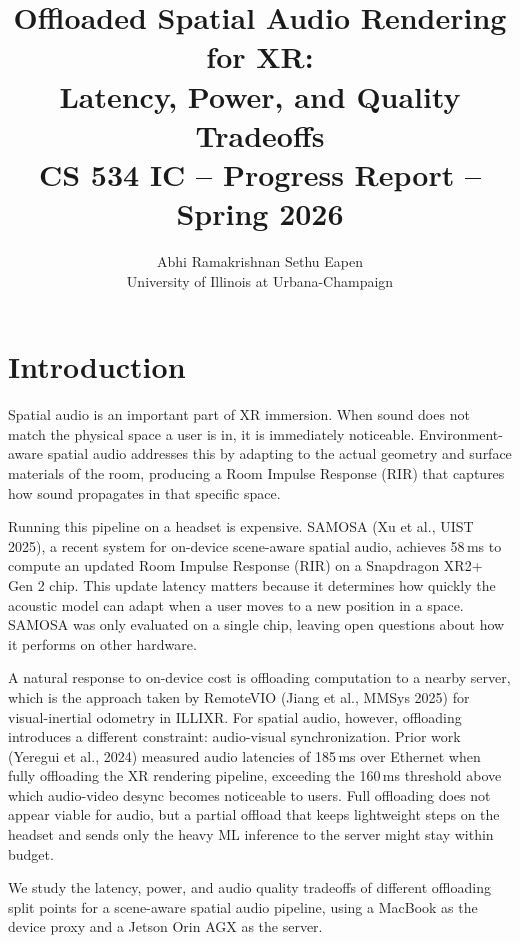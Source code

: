 \documentclass[11pt]{article}
\title{\textbf{Offloaded Spatial Audio Rendering for XR:\\
       Latency, Power, and Quality Tradeoffs}\\[6pt]
       \normalsize CS 534 IC -- Progress Report -- Spring 2026}
\author{Abhi Ramakrishnan \quad Sethu Eapen\\
        \small University of Illinois at Urbana-Champaign}
\date{}
\begin{document}
\maketitle
\thispagestyle{plain}

\section{Introduction}

Spatial audio is an important part of XR immersion. When sound does not
match the physical space a user is in, it is immediately noticeable.
Environment-aware spatial audio addresses this by adapting to the actual
geometry and surface materials of the room, producing a Room Impulse
Response (RIR) that captures how sound propagates in that specific space.

Running this pipeline on a headset is expensive. SAMOSA (Xu et al., UIST 2025),
a recent system for on-device scene-aware spatial audio, achieves 58\,ms
to compute an updated Room Impulse Response (RIR) on a Snapdragon XR2+ Gen 2
chip. This update latency matters because it determines how quickly the
acoustic model can adapt when a user moves to a new position in a space.
SAMOSA was only evaluated on a single chip, leaving open questions about
how it performs on other hardware.

A natural response to on-device cost is offloading computation to a nearby
server, which is the approach taken by RemoteVIO (Jiang et al., MMSys 2025)
for visual-inertial odometry in ILLIXR. For spatial audio, however, offloading
introduces a different constraint: audio-visual synchronization. Prior work
(Yeregui et al., 2024) measured audio latencies of 185\,ms over Ethernet
when fully offloading the XR rendering pipeline, exceeding the 160\,ms
threshold above which audio-video desync becomes noticeable to users. Full
offloading does not appear viable for audio, but a partial offload that keeps
lightweight steps on the headset and sends only the heavy ML inference to the
server might stay within budget.

We study the latency, power, and audio quality tradeoffs of different
offloading split points for a scene-aware spatial audio pipeline, using
a MacBook as the device proxy and a Jetson Orin AGX as the server.

\end{document}
